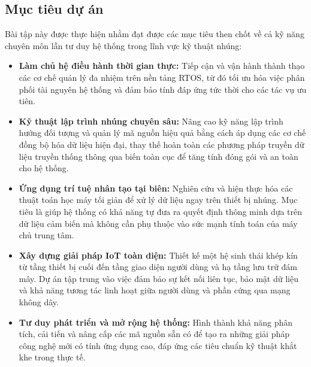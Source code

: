 \subsection{Mục tiêu dự án}
Bài tập này được thực hiện nhằm đạt được các mục tiêu then chốt về cả kỹ năng chuyên môn lẫn tư duy hệ thống trong lĩnh vực kỹ thuật nhúng:
\begin{itemize}
    \item \textbf{Làm chủ hệ điều hành thời gian thực:} Tiếp cận và vận hành thành thạo các cơ chế quản lý đa nhiệm trên nền tảng RTOS, từ đó tối ưu hóa việc phân phối tài nguyên hệ thống và đảm bảo tính đáp ứng tức thời cho các tác vụ ưu tiên.
    \item \textbf{Kỹ thuật lập trình nhúng chuyên sâu:} Nâng cao kỹ năng lập trình hướng đối tượng và quản lý mã nguồn hiệu quả bằng cách áp dụng các cơ chế đồng bộ hóa dữ liệu hiện đại, thay thế hoàn toàn các phương pháp truyền dữ liệu truyền thống thông qua biến toàn cục để tăng tính đóng gói và an toàn cho hệ thống.
    \item \textbf{Ứng dụng trí tuệ nhân tạo tại biên:} Nghiên cứu và hiện thực hóa các thuật toán học máy tối giản để xử lý dữ liệu ngay trên thiết bị nhúng. Mục tiêu là giúp hệ thống có khả năng tự đưa ra quyết định thông minh dựa trên dữ liệu cảm biến mà không cần phụ thuộc vào sức mạnh tính toán của máy chủ trung tâm.
    \item \textbf{Xây dựng giải pháp IoT toàn diện:} Thiết kế một hệ sinh thái khép kín từ tầng thiết bị cuối đến tầng giao diện người dùng và hạ tầng lưu trữ đám mây. Dự án tập trung vào việc đảm bảo sự kết nối liên tục, bảo mật dữ liệu và khả năng tương tác linh hoạt giữa người dùng và phần cứng qua mạng không dây.
    \item \textbf{Tư duy phát triển và mở rộng hệ thống:} Hình thành khả năng phân tích, cải tiến và nâng cấp các mã nguồn sẵn có để tạo ra những giải pháp công nghệ mới có tính ứng dụng cao, đáp ứng các tiêu chuẩn kỹ thuật khắt khe trong thực tế.
\end{itemize}

